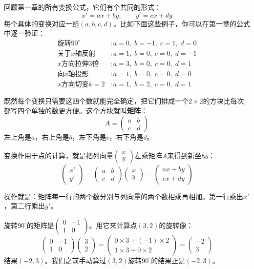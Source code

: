 

回顾第一章的所有变换公式，它们有个共同的形式：
\[
x' = ax + by,\qquad y' = cx + dy
\]
每个具体的变换对应一组$(a,b,c,d)$。比如下面这些例子，你可以在第一章的公式中逐一验证：
\begin{align*}
\text{旋转}90^\circ &:a=0,\;b=-1,\;c=1,\;d=0\\
\text{关于$x$轴反射} &:a=1,\;b=0,\;c=0,\;d=-1\\
\text{$x$方向拉伸$3$倍} &:a=3,\;b=0,\;c=0,\;d=1\\
\text{向$x$轴投影} &:a=1,\;b=0,\;c=0,\;d=0\\
\text{$x$方向切变$k=2$} &:a=1,\;b=2,\;c=0,\;d=1
\end{align*}

既然每个变换只需要这四个数就能完全确定，把它们排成一个$2\times2$的方块比每次都写四个单独的数更方便。这个方块就叫\textbf{矩阵}：
\[
A = \begin{pmatrix}a&b\\c&d\end{pmatrix}
\]
左上角是$a$，右上角是$b$，左下角是$c$，右下角是$d$。

变换作用于点的计算，就是把列向量$\begin{pmatrix}x\\y\end{pmatrix}$左乘矩阵$A$来得到新坐标：
\[
\begin{pmatrix}x'\\y'\end{pmatrix}
= \begin{pmatrix}a&b\\c&d\end{pmatrix}
\begin{pmatrix}x\\y\end{pmatrix}
= \begin{pmatrix}ax+by\\cx+dy\end{pmatrix}
\]

操作就是：矩阵每一行的两个数分别与列向量的两个数相乘再相加。第一行乘出$x'$，第二行乘出$y'$。

\begin{example}
旋转$90^\circ$的矩阵是$\begin{pmatrix}0&-1\\1&0\end{pmatrix}$。用它来计算点$(3,2)$的旋转像：
\[
\begin{pmatrix}0&-1\\1&0\end{pmatrix}\begin{pmatrix}3\\2\end{pmatrix}
= \begin{pmatrix}0\times3+(-1)\times2\\1\times3+0\times2\end{pmatrix}
= \begin{pmatrix}-2\\3\end{pmatrix}
\]
结果$(-2,3)$。我们之前手动算过$(3,2)$旋转$90^\circ$的结果正是$(-2,3)$。
\end{example}

